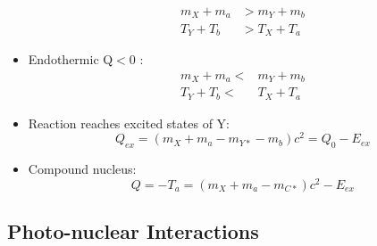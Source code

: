 \documentclass[letter]{article}
\begin{document}
\begin{itemize}
\begin{equation*}
  \begin{split}
   m_{X}+m_{a}&>m_{Y}+m_{b}\\
   T_{Y}+T_{b}&>T_{X}+T_{a}
  \end{split}
\end{equation*}
\item Endothermic Q$<$0 :
  \begin{equation*}
  \begin{split}
    m_{X}+m_{a}<&m_{Y}+m_{b}\\
T_{Y}+T_{b}<&T_{X}+T_{a}
  \end{split}
\end{equation*}
\item Reaction reaches excited states of Y:
  \begin{equation*}
Q_{ex} = (m_{X}+m_{a}-m_{Y*}-m_{b})c^{2}  = Q_{0}-E_{ex}
\end{equation*}
\item Compound nucleus:
  \begin{equation*}
Q = -T_{a} = (m_{X}+m_{a}-m_{C*})c^{2}-E_{ex}
\end{equation*}

\end{itemize}

\subsection{Photo-nuclear Interactions}
\end{document}
